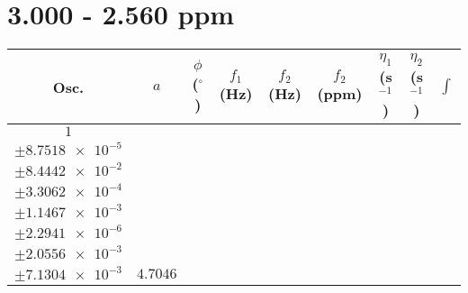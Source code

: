 \documentclass[8pt]{article}
\begin{document}
\section*{3.000 - 2.560 ppm}
\begin{longtable}[l]{c c c c c c c c c}
\toprule
Osc. & $a$ & $\phi$ ($^{\circ}$) & $f_1$ (Hz) & $f_2$ (Hz) & $f_2$ (ppm) & $\eta_1$ (s$^{-1}$) & $\eta_2$ (s$^{-1}$) & $\int$\\
\midrule
$\num{1}$ & \begin{tabular}[c]{@{}c@{}}$\num{5.9944e-2}$ \\ $\pm\num{8.7518e-5}$\end{tabular} & \begin{tabular}[c]{@{}c@{}}$\num{-9.2906e-2}$ \\ $\pm\num{8.4442e-2}$\end{tabular} & \begin{tabular}[c]{@{}c@{}}$\num{-12.902}$ \\ $\pm\num{3.3062e-4}$\end{tabular} & \begin{tabular}[c]{@{}c@{}}$\num{1.3213e+3}$ \\ $\pm\num{1.1467e-3}$\end{tabular} & \begin{tabular}[c]{@{}c@{}}$\num{2.6433}$ \\ $\pm\num{2.2941e-6}$\end{tabular} & \begin{tabular}[c]{@{}c@{}}$\num{1.1588}$ \\ $\pm\num{2.0556e-3}$\end{tabular} & \begin{tabular}[c]{@{}c@{}}$\num{4.2221}$ \\ $\pm\num{7.1304e-3}$\end{tabular} & $\num{4.7046}$\\

\end{longtable}
\end{document}
